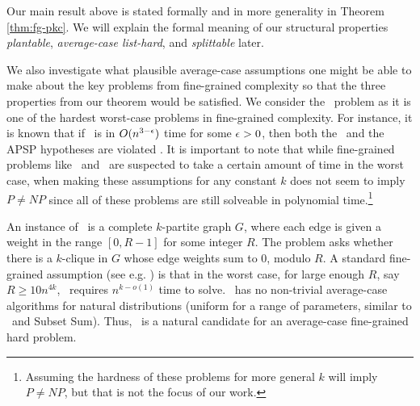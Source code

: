 Our main result above is stated formally and in more generality in Theorem \ref{thm:fg-pkc}. We will explain the formal meaning of our structural properties  \emph{plantable}, \emph{average-case list-hard}, and \emph{splittable} later. 


We also investigate what plausible average-case assumptions one might be able to make about the key problems from fine-grained complexity so that the three properties from our theorem would be satisfied.
We consider the \zkclique~problem as it is one of the hardest worst-case problems in fine-grained complexity. For instance, it is known that if \zThclique~is in $O(n^{3-\epsilon})$ time for some $\epsilon>0$, then both the \ThSum~and the APSP hypotheses are violated \cite{icm-survey,WilliamsW13j}. It is important to note that while fine-grained problems like \zkclique~and \kSum~are suspected to take a certain amount of time in the worst case, when making these assumptions for any constant $k$ does not seem to imply $P \neq NP$ since all of these problems are still solveable in polynomial time.\footnote{Assuming the hardness of these problems for more general $k$ will imply $P \neq NP$, but that is not the focus of our work.}

An instance of \zkclique~is a complete $k$-partite graph $G$, where each edge is given a weight in the range $[0,R-1]$ for some integer $R$. The problem asks whether there is a $k$-clique in $G$ whose edge weights sum to $0$, modulo $R$. A standard fine-grained assumption (see e.g. \cite{icm-survey}) is that in the worst case, for large enough $R$, say $R\geq 10n^{4k}$, \zkclique~requires $n^{k-o(1)}$ time to solve. 
\zkclique~has no non-trivial average-case algorithms for natural distributions (uniform for a range of parameters, similar to \kSum~and Subset Sum). Thus, \zkclique~is a natural candidate for an average-case fine-grained hard problem.
\\





